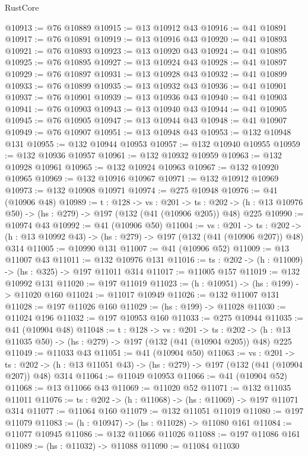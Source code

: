 \begin{lexlean}{RustCore}
\begin{coremodule}
@10913 := @76 @10889
@10915 := @13 @10912 @43
@10916 := @41 @10891
@10917 := @76 @10891
@10919 := @13 @10916 @43
@10920 := @41 @10893
@10921 := @76 @10893
@10923 := @13 @10920 @43
@10924 := @41 @10895
@10925 := @76 @10895
@10927 := @13 @10924 @43
@10928 := @41 @10897
@10929 := @76 @10897
@10931 := @13 @10928 @43
@10932 := @41 @10899
@10933 := @76 @10899
@10935 := @13 @10932 @43
@10936 := @41 @10901
@10937 := @76 @10901
@10939 := @13 @10936 @43
@10940 := @41 @10903
@10941 := @76 @10903
@10943 := @13 @10940 @43
@10944 := @41 @10905
@10945 := @76 @10905
@10947 := @13 @10944 @43
@10948 := @41 @10907
@10949 := @76 @10907
@10951 := @13 @10948 @43
@10953 := @132 @10948 @131
@10955 := @132 @10944 @10953
@10957 := @132 @10940 @10955
@10959 := @132 @10936 @10957
@10961 := @132 @10932 @10959
@10963 := @132 @10928 @10961
@10965 := @132 @10924 @10963
@10967 := @132 @10920 @10965
@10969 := @132 @10916 @10967
@10971 := @132 @10912 @10969
@10973 := @132 @10908 @10971
@10974 := @275 @10948
@10976 := @41 (@10906 @48)
@10989 := {t : @128} ->
  {vs : @201} ->
  {ts : @202} -> (h : @13 @10976 @50) -> (hs : @279) -> @197 (@132 (@41 (@10906 @205)) @48) @225
@10990 := @10974 @43
@10992 := @41 (@10906 @50)
@11004 := {vs : @201} ->
  {ts : @202} -> (h : @13 @10992 @43) -> (hs : @279) -> @197 (@132 (@41 (@10906 @207)) @48) @314
@11005 := @10990 @131
@11007 := @41 (@10906 @52)
@11009 := @13 @11007 @43
@11011 := @132 @10976 @131
@11016 := {ts : @202} -> (h : @11009) -> (hs : @325) -> @197 @11011 @314
@11017 := @11005 @157
@11019 := @132 @10992 @131
@11020 := @197 @11019
@11023 := (h : @10951) -> (hs : @199) -> @11020 @160
@11024 := @11017 @10949
@11026 := @132 @11007 @131
@11028 := @197 @11026 @160
@11029 := (hs : @199) -> @11028
@11030 := @11024 @196
@11032 := @197 @10953 @160
@11033 := @275 @10944
@11035 := @41 (@10904 @48)
@11048 := {t : @128} ->
  {vs : @201} ->
  {ts : @202} -> (h : @13 @11035 @50) -> (hs : @279) -> @197 (@132 (@41 (@10904 @205)) @48) @225
@11049 := @11033 @43
@11051 := @41 (@10904 @50)
@11063 := {vs : @201} ->
  {ts : @202} -> (h : @13 @11051 @43) -> (hs : @279) -> @197 (@132 (@41 (@10904 @207)) @48) @314
@11064 := @11049 @10953
@11066 := @41 (@10904 @52)
@11068 := @13 @11066 @43
@11069 := @11020 @52
@11071 := @132 @11035 @11011
@11076 := {ts : @202} -> (h : @11068) -> (hs : @11069) -> @197 @11071 @314
@11077 := @11064 @160
@11079 := @132 @11051 @11019
@11080 := @197 @11079
@11083 := (h : @10947) -> (hs : @11028) -> @11080 @161
@11084 := @11077 @10945
@11086 := @132 @11066 @11026
@11088 := @197 @11086 @161
@11089 := (hs : @11032) -> @11088
@11090 := @11084 @11030

\end{coremodule}
\end{lexlean}

